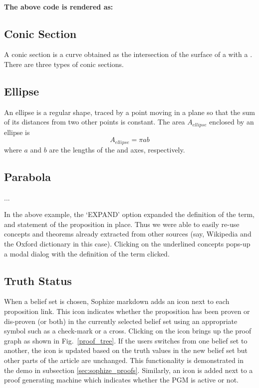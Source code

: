\documentclass[runningheads]{llncs}
\begin{document}
\paragraph{The above code is rendered as:}
\begin{mdframed}
\section*{Conic Section}
A conic section is a curve obtained as the intersection of the surface of a  with a . There are three types of conic sections.

\subsection*{Ellipse}
An ellipse is a regular  shape, traced by a point moving in a plane so that the sum of its distances from two other points is constant. The area $A_{ellipse}$ enclosed by an ellipse is $$A_{ellipse} = \pi a b$$where $a$ and $b$ are the lengths of the  and  axes, respectively.

\subsection*{Parabola}
...

\end{mdframed}

In the above example, the `EXPAND' option expanded the definition of the term, and statement of the proposition in place. Thus we were able to easily re-use concepts and theorems already extracted from other sources (say, Wikipedia and the Oxford dictionary in this case). Clicking on the underlined concepts pops-up a modal dialog with the definition of the term clicked.

\subsection{Truth Status}

When a belief set is chosen, Sophize markdown adds an icon next to each proposition link. This icon indicates whether the proposition has been proven or dis-proven (or both) in the currently selected belief set using an appropriate symbol such as a check-mark or a cross. Clicking on the icon brings up the proof graph as shown in Fig.~\ref{proof_tree}. If the users switches from one belief set to another, the icon is updated based on the truth values in the new belief set but other parts of the article are unchanged. This functionality is demonstrated in the demo in subsection \ref{sec:sophize_proofs}. Similarly, an icon is added next to a proof generating machine which indicates whether the PGM is active or not.
\end{document}
